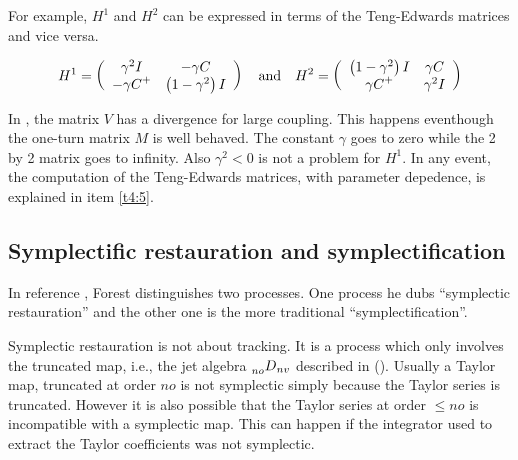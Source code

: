 \documentclass{hitec}     %
\begin{document}
{{{For example, $H^1$ and  $H^2$ can be expressed in terms of the Teng-Edwards matrices and vice versa.

%
\begin{eqnarray}{H}^{1}=
\left({\begin{array}{cc}{\gamma }^{2}I&-\gamma C\\
-{\gamma C}^{+}&\left({1-{\gamma }^{2}}\right)I\end{array}}\right)~~~{\rm a}{\rm n}{\rm d} ~~~{H}^{2}=
\left({\begin{array}{cc}\left({1-{\gamma }^{2}}\right)I&\gamma C\\
{\gamma C}^{+}&{\gamma }^{2}I\end{array}}\right)\label{eq:hmat}\end{eqnarray}
%

In , the matrix $V$  has a divergence for large coupling.  This happens eventhough  the one-turn matrix $M$ is well behaved. The constant $\gamma $ goes to zero while the 2 by 2 matrix goes to infinity. Also ${\gamma }^2 <0 $ is not a problem for $H^1$. In any event, the computation of the Teng-Edwards matrices, with parameter depedence, is explained in item \ref{t4:5}.

\subsection{ Symplectific restauration and symplectification}
\label{s:symf}

In reference \cite{forestreview}, Forest distinguishes two processes. One process he dubs ``symplectic restauration'' and the other one is the more traditional ``symplectification''.

Symplectic restauration is not about tracking. It is a process which only involves the  truncated map, i.e., the jet algebra $\prescript{}{no}{D}_{nv}$ described in (). Usually a Taylor map, truncated at order $no$ is not symplectic simply because the Taylor series is truncated. However it is also possible that the Taylor series at order $\le no$ is  incompatible with a symplectic map. This can happen if the integrator used to extract the Taylor coefficients was not symplectic.

}}}
\end{document}
